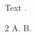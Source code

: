 \documentclass[preprint,12pt]{elsarticle}
\begin{document}
Text \citep{a,b}.
\begin{thebibliography}{2}
 A.
 B.
\end{thebibliography}
\end{document}

